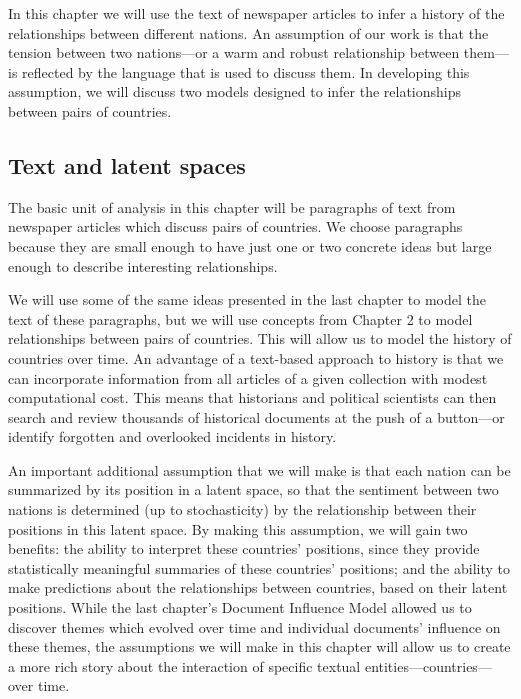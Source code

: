 In this chapter we will use the text of newspaper articles to infer a
history of the relationships between different nations.  An assumption
of our work is that the tension between two nations---or a warm and
robust relationship between them---is reflected by the language that
is used to discuss them.  In developing this assumption, we will
discuss two models designed to infer the relationships between pairs
of countries.

\subsection*{Text and latent spaces}
The basic unit of analysis in this chapter will be paragraphs of text
from newspaper articles which discuss pairs of countries.  We choose
paragraphs because they are small enough to have just one or two
concrete ideas but large enough to describe interesting
relationships.

We will use some of the same ideas presented in the last chapter to
model the text of these paragraphs, but we will use concepts from
Chapter 2 to model relationships between pairs of countries.  This
will allow us to model the history of countries over time.  An
advantage of a text-based approach to history is that we can
incorporate information from all articles of a given collection with
modest computational cost.  This means that historians and political
scientists can then search and review thousands of historical
documents at the push of a button---or identify forgotten and
overlooked incidents in history.

An important additional assumption that we will make is that each
nation can be summarized by its position in a latent space, so that
the sentiment between two nations is determined (up to stochasticity)
by the relationship between their positions in this latent space.  By
making this assumption, we will gain two benefits: the ability to
interpret these countries' positions, since they provide statistically
meaningful summaries of these countries' positions; and the ability to
make predictions about the relationships between countries, based on
their latent positions. While the last chapter's Document Influence
Model allowed us to discover themes which evolved over time and individual
documents' influence on these themes, the assumptions we will make in
this chapter will allow us to create a more rich story about the
interaction of specific textual entities---countries---over time.


